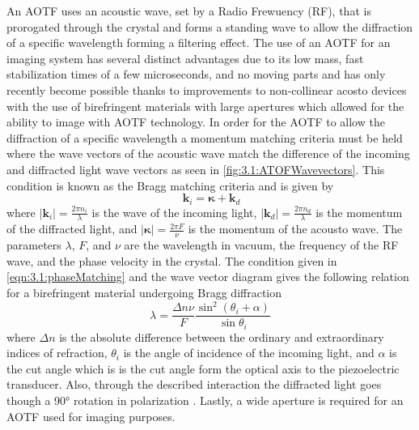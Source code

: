 \documentclass[12pt]{article}
\begin{document}
An AOTF uses an acoustic wave, set by a Radio Frewuency (RF), that is prorogated through the crystal and forms a standing wave to allow the diffraction of a specific wavelength forming a filtering effect. The use of an AOTF for an imaging system has several distinct advantages due to its low mass, fast stabilization times of a few microseconds, and no moving parts and has only recently become possible thanks to improvements to non-collinear acosto devices with the use of birefringent materials with large apertures \citep{Chang1974, Voloshinov2007} which allowed for the ability to image with AOTF technology. In order for the AOTF to allow the diffraction of a specific wavelength a momentum matching criteria must be held where the wave vectors of the acoustic wave match the difference of the incoming and diffracted light wave vectors as seen in \autoref{fig:3.1:ATOFWavevectors}. This condition is known as the Bragg matching criteria and is given by
\begin{equation}
    \ \mathbf{k}_{i} = \boldsymbol\kappa + \mathbf{k}_{d}
    \label{eqn:3.1:phaseMatching}
\end{equation}
where $\left|\mathbf{k}_{i}\right| = \frac{2\pi n_{i}}{\lambda}$ is the wave of the incoming light, $\left|\mathbf{k}_{d}\right| = \frac{2\pi n_{d}}{\lambda}$ is the momentum of the diffracted light, and $\left|\boldsymbol\kappa\right| = \frac{2\pi F}{\nu}$ is the momentum of the acousto wave. The parameters $\lambda$, $F$, and $\nu$ are the wavelength in vacuum, the frequency of the RF wave, and the phase velocity in the crystal. The condition given in \autoref{eqn:3.1:phaseMatching} and the wave vector diagram gives the following relation for a birefringent material undergoing Bragg diffraction
\begin{equation}
    \lambda  = \frac{\Delta n\nu}{F}\frac{\sin^{2}(\theta_{i}+\alpha)}{\sin\theta_{i}}
    \label{eqn:3.1:AOTFWavelengthDependance}
\end{equation}
where $\Delta n$ is the absolute difference between the ordinary and extraordinary indices of refraction, $\theta_{i}$ is the angle of incidence of the incoming light, and $\alpha$ is the cut angle which is is the cut angle form the optical axis to the piezoelectric transducer. Also, through the described interaction the diffracted light goes though a 90\si{\degree} rotation in polarization \citep{Voloshinov1996}. Lastly, a wide aperture is required for an AOTF used for imaging purposes.
\end{document}
